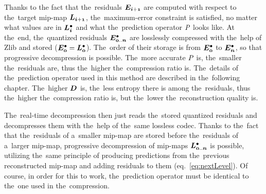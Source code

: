 Thanks to the fact that the~residuals $\objnorm{E}{i+1}$ are computed with respect to the~target mip-map $\lnorm{i+1}$, the~maximum-error constraint is satisfied, no matter what values are in $\ldot{i}$ and what the~prediction operator $\mathit{P_{}}$ looks like. At the~end, the~quantized residuals $\objdot{E}{0..n}$ are losslessly compressed with the~help of Zlib and stored ($\objdot{E}{0} = \ldot{0}$). The~order of their storage is from $\objdot{E}{0}$ to $\objdot{E}{n}$, so that progressive decompression is possible. The~more accurate $\mathit{P_{}}$ is, the~smaller the~residuals are, thus the~higher the~compression ratio is. The~details of the~prediction operator used in this method are described in the~following chapter. The~higher $\objnorm{D}{}$ is, the~less entropy there is among the~residuals, thus the~higher the~compression ratio is, but the~lower the~reconstruction quality is.

The~real-time decompression then just reads the~stored quantized residuals and decompresses them with the~help of the~same lossless codec. Thanks to the~fact that the~residuals of a~smaller mip-map are stored before the~residuals of a~larger mip-map, progressive decompression of mip-maps $\ldot{0..n}$ is possible, utilizing the~same principle of producing predictions from the~previous reconstructed mip-map and adding residuals to them (eq.~\ref{eq:nextLevel}). Of course, in order for this to work, the~prediction operator must be identical to the~one used in the~compression.